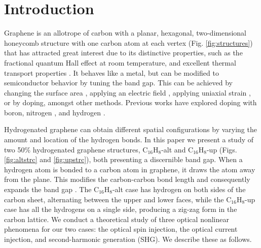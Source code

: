 \documentclass[pss]{wiley2sp} %
\begin{document}
\maketitle


\section{Introduction}\label{sec:intro}

Graphene is an allotrope of carbon with a planar, hexagonal, two-dimensional
honeycomb structure with one carbon atom at each vertex (Fig.
\ref{fig:structures}) that has attracted great interest due to its distinctive
properties, such as the fractional quantum Hall effect at room temperature,
and excellent thermal transport properties
\cite{geimNM07,reinaNL08,novoselov2S7,balandinNL08}. It behaves
like a metal, but can be modified to semiconductor behavior by tuning the band
gap. This can be achieved by changing the surface area \cite{hanPRL07},
applying an electric field \cite{zhangN09}, applying uniaxial strain
\cite{niACSN08}, or by doping, amongst other methods. Previous works have
explored doping with boron, nitrogen \cite{guoIJ11}, and hydrogen
\cite{eliasS09,guisingerNL09,samarakoonACSN10}.

Hydrogenated graphene can obtain different spatial configurations by varying
the amount and location of the hydrogen bonds. In this paper we present a
study of two 50\% hydrogenated graphene structures, C$_{16}$H$_{8}$-alt and
C$_{16}$H$_{8}$-up (Figs. \ref{fig:altstrc} and \ref{fig:upstrc}), both
presenting a discernible band gap. When a hydrogen atom is bonded to a carbon
atom in graphene, it draws the atom away from the plane. This modifies the
carbon-carbon bond length and consequently expands the band gap
\cite{samarakoonACSN10}. The C$_{16}$H$_{8}$-alt case has hydrogen on both
sides of the carbon sheet, alternating between the upper and lower faces,
while the C$_{16}$H$_{8}$-up case has all the hydrogens on a single side,
producing a zig-zag form in the carbon lattice. We conduct a theoretical study
of three optical nonlinear phenomena for our two cases: the optical spin
injection, the optical current injection, and second-harmonic generation
(SHG). We describe these as follows.
\end{document}
